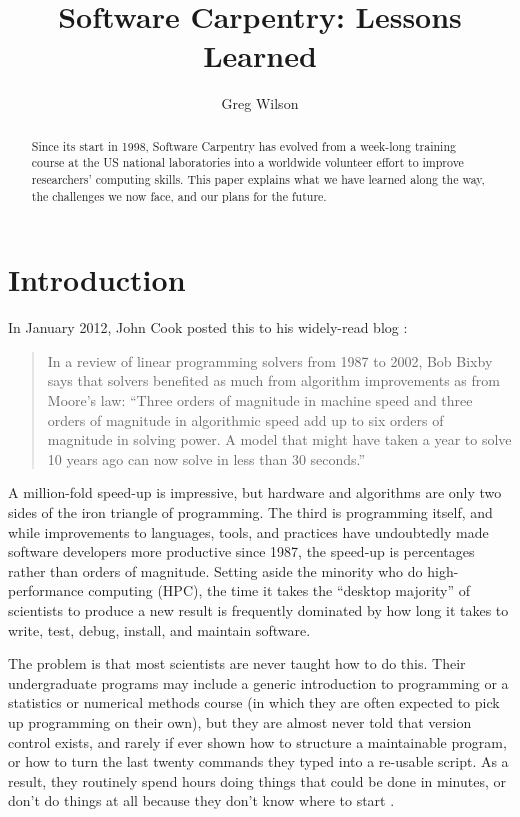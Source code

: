 \documentclass[10pt,a4paper,twocolumn]{article}
\begin{document}
\title{Software Carpentry: Lessons Learned}
\author[1]{Greg Wilson}

\maketitle
\thispagestyle{fancy}

\begin{abstract}

Since its start in 1998, Software Carpentry has evolved from a
week-long training course at the US national laboratories into a
worldwide volunteer effort to improve researchers' computing
skills. This paper explains what we have learned along the way, the
challenges we now face, and our plans for the future.

\end{abstract}
\clearpage

\section*{Introduction}

In January 2012, John Cook posted this to his widely-read blog
\cite{cook2012}:

\begin{quote}
In a review of linear programming solvers from 1987 to 2002, Bob Bixby
says that solvers benefited as much from algorithm improvements as from
Moore's law: ``Three orders of magnitude in machine speed and three
orders of magnitude in algorithmic speed add up to six orders of
magnitude in solving power. A model that might have taken a year to
solve 10 years ago can now solve in less than 30 seconds.''
\end{quote}

A million-fold speed-up is impressive, but hardware and algorithms are
only two sides of the iron triangle of programming. The third is
programming itself, and while improvements to languages, tools, and
practices have undoubtedly made software developers more productive
since 1987, the speed-up is percentages rather than orders of
magnitude.  Setting aside the minority who do high-performance
computing (HPC), the time it takes the ``desktop majority'' of
scientists to produce a new result is frequently dominated by how long
it takes to write, test, debug, install, and maintain software.

The problem is that most scientists are never taught how to do
this. Their undergraduate programs may include a generic introduction
to programming or a statistics or numerical methods course (in which
they are often expected to pick up programming on their own), but they
are almost never told that version control exists, and rarely if ever
shown how to structure a maintainable program, or how to turn the last
twenty commands they typed into a re-usable script. As a result, they
routinely spend hours doing things that could be done in minutes, or
don't do things at all because they don't know where to start
\cite{hannay2009,prabhu2011}.
\end{document}
